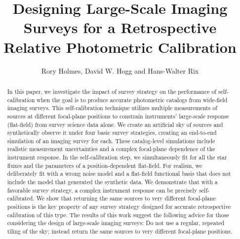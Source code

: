 \documentclass[preprint,pdftex]{aastex}
\begin{document}

\title{Designing Large-Scale Imaging Surveys for a Retrospective Relative Photometric Calibration}


\author{Rory Holmes, David W. Hogg and Hans-Walter Rix}

\begin{abstract}
In this paper, we investigate the impact of survey strategy on the performance of self-calibration when the goal is to produce accurate photometric catalogs
from wide-field imaging surveys. This self-calibration technique utilizes multiple measurements of sources at different focal-plane positions to constrain instruments' large-scale response (flat-field) from survey science data alone. We create an artificial sky of sources
and synthetically observe it under four basic survey strategies,
creating an end-to-end simulation of an imaging survey for each. These
catalog-level simulations include realistic measurement uncertainties
and a complex focal-plane dependence of the instrument response. In the
self-calibration step, we simultaneously fit for all the star fluxes
and the parameters of a position-dependent flat-field.  For realism,
we deliberately fit with a wrong noise model and a flat-field
functional basis that does not include the model that generated the
synthetic data.  We demonstrate that with a favorable survey strategy,
a complex instrument response can be precisely
self-calibrated. We show that returning the same sources to very
different focal-plane positions is the key property of any survey
strategy designed for accurate retrospective calibration of this type. The results
of this work suggest the following advice for those considering the
design of large-scale imaging surveys: Do not use a regular, repeated tiling of
the sky; instead return the same sources to very different focal-plane
positions.
\end{abstract}
\end{document}
